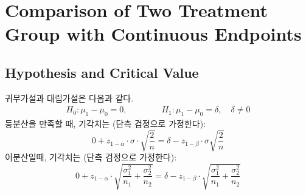 \section{Comparison of Two Treatment Group with Continuous Endpoints}



\subsection{Hypothesis and Critical Value}
귀무가설과 대립가설은 다음과 같다. 
    \begin{align*}
        H_0 : \mu_1-\mu_0 = 0, \qquad\qquad  H_1 : \mu_1-\mu_0 = \delta, \quad \delta \neq 0
    \end{align*}
    \noindent
등분산을 만족할 때, 기각치는 (단측 검정으로 가정한다): 
    \begin{equation*}
        0 + z_{1-\alpha}\cdot\sigma\cdot\sqrt{\frac{2}{n}} = \delta-z_{1-\beta}\cdot\sigma\sqrt{\frac{2}{n}}
    \end{equation*}
    \noindent
이분산일때, 기각치는 (단측 검정으로 가정한다): 
    \begin{equation*}
        0 + z_{1-\alpha}\cdot\sqrt{\frac{\sigma_1^2}{n_1}+\frac{\sigma_2^2}{n_2}} 
        = \delta-z_{1-\beta}\cdot\sqrt{\frac{\sigma_1^2}{n_1}+\frac{\sigma_2^2}{n_2}}
    \end{equation*}




